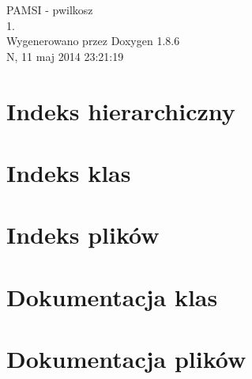 \documentclass[twoside]{book}
\newcommand{\clearemptydoublepage}{%
  \newpage{\pagestyle{empty}\cleardoublepage}%
}
\begin{document}
\hypersetup{pageanchor=false}
\begin{titlepage}
\vspace*{7cm}
\begin{center}%
{\Large P\-A\-M\-S\-I -\/ pwilkosz \\[1ex]\large 1. }\\
\vspace*{1cm}
{\large Wygenerowano przez Doxygen 1.8.6}\\
\vspace*{0.5cm}
{\small N, 11 maj 2014 23:21:19}\\
\end{center}
\end{titlepage}
\clearemptydoublepage
\tableofcontents
\clearemptydoublepage
{}
\hypersetup{pageanchor=true}

\chapter{Indeks hierarchiczny}

\chapter{Indeks klas}

\chapter{Indeks plików}

\chapter{Dokumentacja klas}


























\chapter{Dokumentacja plików}



















\newpage
{}
{}
\printindex
\end{document}
